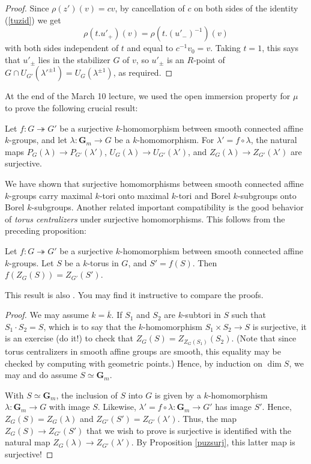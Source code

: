 \documentclass[10pt]{article}
\renewcommand{\(}{\left(}
\renewcommand{\)}{\right)}
\numberwithin{thm}{subsection}
\begin{document}
\begin{proof}
Since $\rho(z')(v) = cv$, by cancellation of $c$ on both sides of 
the identity (\ref{tuzid}) we get $$\rho(t.u'_{+})(v) = \rho(t.(u'_{-})^{-1})(v)$$ with both sides
independent of $t$ and equal to $c^{-1} v_0 = v$.  Taking $t = 1$, this says that $u'_{\pm}$ lies
in the stabilizer $G$ of $v$, so $u'_{\pm}$ is an $R$-point of $G \cap U_{G'}({\lambda'}^{\pm 1}) = 
U_G(\lambda^{\pm 1})$,
as required.  
\end{proof}

At the end of the March 10 lecture,
we used the open immersion property for $\mu$ to prove the following crucial result:

\begin{proposition}\label{puzsurj}
Let $f:G \twoheadrightarrow G'$ be a surjective $k$-homomorphism between smooth
connected affine $k$-groups, and let $\lambda:\mathbf{G}_m \rightarrow G$ be
a $k$-homomorphism.  For $\lambda' = f \circ \lambda$, the natural maps
$P_G(\lambda) \rightarrow P_{G'}(\lambda')$,
$U_{G}(\lambda) \rightarrow U_{G'}(\lambda')$,
and $Z_G(\lambda) \rightarrow Z_{G'}(\lambda')$ are surjective.
\end{proposition}

We have shown that surjective homomorphisms between smooth connected
affine $k$-groups carry maximal $k$-tori onto maximal $k$-tori and Borel $k$-subgroups
onto Borel $k$-subgroups.  Another related important compatibility is the good behavior of
{\em torus centralizers} under surjective homomorphisms.  This follows from the preceding proposition:

\begin{corollary}\label{zimage} Let $f:G \twoheadrightarrow G'$ be a surjective $k$-homomorphism between
smooth connected affine $k$-groups. Let $S$ be a $k$-torus in $G$,
and $S' = f(S)$. Then $f(Z_G(S)) = Z_{G'}(S')$.
\end{corollary}

This result is also \cite[11.14, Cor.\,2]{borel}.  You may find it instructive to compare the proofs. 

\begin{proof}
We may assume $k = \overline{k}$.  If $S_1$ and $S_2$ are $k$-subtori in $S$
such that $S_1 \cdot S_2 = S$, which is to say that the $k$-homomorphism
$S_1 \times S_2 \rightarrow S$ is surjective, it is an exercise (do it!)
to check that $Z_G(S) = Z_{Z_G(S_1)}(S_2)$.  (Note that since torus centralizers in smooth
affine groups are smooth, this equality may be checked by computing with geometric points.) 
Hence, by induction on
$\dim S$, we may and do assume $S \simeq \mathbf{G}_m$.

With $S \simeq \mathbf{G}_m$, the inclusion of $S$ into $G$ is given by a $k$-homomorphism
$\lambda:\mathbf{G}_m \rightarrow G$ with image $S$.
Likewise, $\lambda' = f \circ \lambda:\mathbf{G}_m \rightarrow G'$ has image $S'$.
Hence, $Z_G(S) = Z_G(\lambda)$ and $Z_{G'}(S') = Z_{G'}(\lambda')$.
Thus, the map $Z_G(S) \rightarrow Z_{G'}(S')$ that we wish to prove is surjective
is identified with the natural map $Z_G(\lambda) \rightarrow Z_{G'}(\lambda')$.
By Proposition \ref{puzsurj}, this latter map is surjective!
\end{proof}
\end{document}
